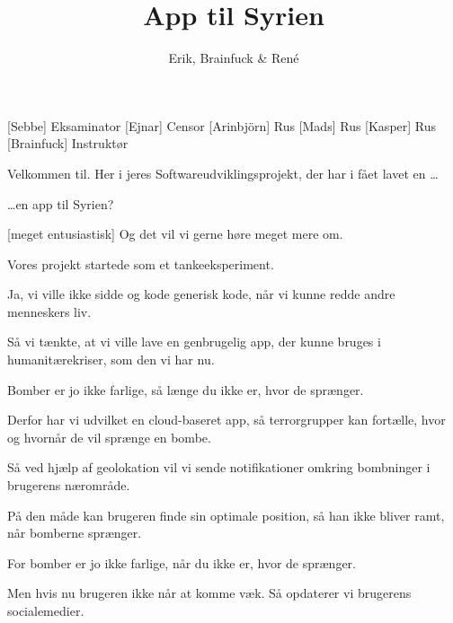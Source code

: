\documentclass[a4paper,11pt]{article}
\title{App til Syrien}
\author{Erik, Brainfuck \& René}
\begin{document}
\maketitle

\begin{roles}
[Sebbe] Eksaminator
[Ejnar] Censor
[Arinbjörn] Rus
[Mads] Rus
[Kasper] Rus
[Brainfuck] Instruktør
\end{roles}

\begin{sketch}


 Velkommen til. Her i jeres Softwareudviklingsprojekt, der har i fået
lavet en \ldots


 \ldots en app til Syrien?

[meget entusiastisk] Og det vil vi gerne høre meget mere om.


 Vores projekt startede som et tankeeksperiment.

 Ja, vi ville ikke sidde og kode generisk kode, når vi kunne redde
andre menneskers liv.

 Så vi tænkte, at vi ville lave en genbrugelig app, der kunne bruges i humanitærekriser, som den vi har nu.


 Bomber er jo ikke farlige, så længe du ikke er, hvor de sprænger.

 Derfor har vi udvilket en cloud-baseret app, så terrorgrupper kan
fortælle, hvor og hvornår de vil sprænge en bombe.

 Så ved hjælp af geolokation vil vi sende notifikationer omkring
bombninger i brugerens nærområde.

 På den måde kan brugeren finde sin optimale position, så han ikke
bliver ramt, når bomberne sprænger.

 For bomber er jo ikke farlige, når du ikke er, hvor de sprænger.

 Men hvis nu brugeren ikke når at komme væk. Så opdaterer vi brugerens socialemedier.



\end{sketch}
\end{document}
